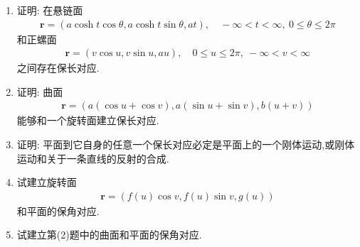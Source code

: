 \documentclass[../../main.tex]{subfiles}%
\begin{document}
\begin{example}
\begin{enumerate}[(1)]
\item 证明: 在悬链面
\begin{align*}
\boldsymbol{r}=(a\cosh t\cos\theta,a\cosh t\sin\theta,at),\quad -\infty<t<\infty,\ 0\leqslant\theta\leqslant2\pi
\end{align*}
和正螺面
\begin{align*}
\boldsymbol{r}=(v\cos u,v\sin u,au),\quad 0\leqslant u\leqslant2\pi,\ -\infty<v<\infty
\end{align*}
之间存在保长对应.

\item 证明: 曲面
\begin{align*}
\boldsymbol{r}=(a(\cos u+\cos v),a(\sin u+\sin v),b(u+v))
\end{align*}
能够和一个旋转面建立保长对应.

\item 证明: 平面到它自身的任意一个保长对应必定是平面上的一个刚体运动,或刚体运动和关于一条直线的反射的合成.

\item 试建立旋转面
\begin{align*}
\boldsymbol{r}=(f(u)\cos v,f(u)\sin v,g(u))
\end{align*}
和平面的保角对应.

\item 试建立第(2)题中的曲面和平面的保角对应.
\end{enumerate}
\end{example}
\end{document}

